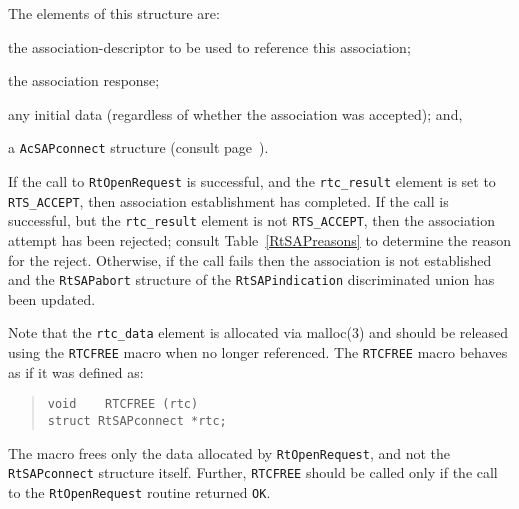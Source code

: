 The elements of this structure are:
\begin{describe}
\item[\verb"rtc\_sd":] the association-descriptor to be used to
reference this association;

\item[\verb"rtc\_result":] the association response;

\item[\verb"rtc\_data":] any initial data
(regardless of whether the association was accepted);
and,

\item[\verb"rtc\_connect":] a \verb"AcSAPconnect" structure
(consult page~\pageref{AcSAPconnect}).
\end{describe}
If the call to \verb"RtOpenRequest" is successful,
and the \verb"rtc_result" element is set to \verb"RTS_ACCEPT",
then association establishment has completed.
If the call is successful,
but the \verb"rtc_result" element is not \verb"RTS_ACCEPT",
then the association attempt has been rejected;
consult Table~\ref{RtSAPreasons} to determine the reason for the reject.
Otherwise, if the call fails then the association is not established and
the \verb"RtSAPabort" structure of the \verb"RtSAPindication" discriminated
union has been updated.

Note that the \verb"rtc_data" element is allocated via \man malloc(3) and
should be released using the \verb"RTCFREE" macro  when no longer referenced.
The \verb"RTCFREE" macro behaves as if it was defined as:
\begin{quote}\small\begin{verbatim}
void    RTCFREE (rtc)
struct RtSAPconnect *rtc;
\end{verbatim}\end{quote}
The macro frees only the data allocated by \verb"RtOpenRequest",
and not the \verb"RtSAPconnect" structure itself.
Further,
\verb"RTCFREE" should be called only if the call to the \verb"RtOpenRequest"
routine returned \verb"OK".

